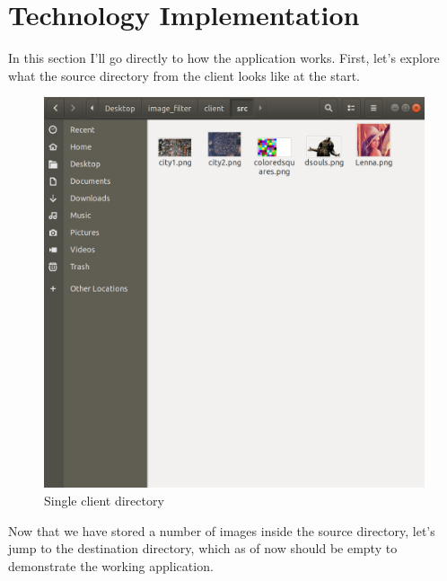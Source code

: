 \documentclass[a4paper,12pt]{article}
\begin{document}
	\section{Technology Implementation}

	In this section I'll go directly to how the application works. First, let's explore what the source directory from the client looks like at the start.
		
	\begin{figure}[H]
		\centering
		\includegraphics[width=\textwidth]{clientsrc.png}
		\caption{Single client directory}
	\end{figure}		
	
	Now that we have stored a number of images inside the source directory, let's jump to the destination directory, which as of now should be empty to demonstrate the working application.
	
\end{document}
